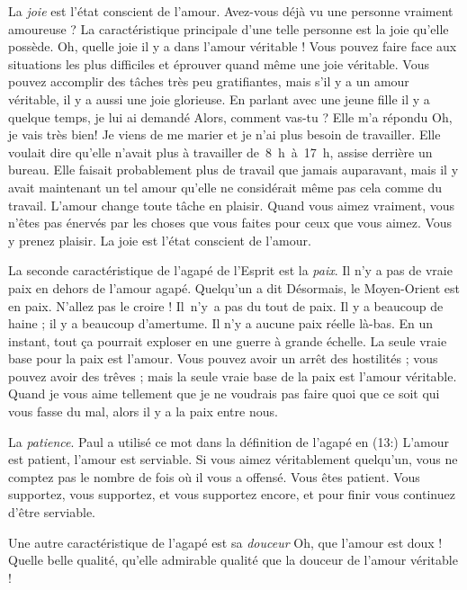 La \emph{joie} est l'état conscient de l'amour.
 Avez-vous déjà vu une
 personne vraiment amoureuse ?
 La caractéristique principale d'une telle personne est la joie
 qu'elle possède. Oh, quelle joie il y a dans l'amour véritable !
 Vous pouvez faire face aux situations les plus difficiles
 et éprouver quand même une joie véritable. Vous pouvez accomplir
 des tâches très peu gratifiantes, mais s'il y a un amour véritable,
 il y a aussi une joie glorieuse. En parlant avec une jeune fille
 il y a quelque temps, je lui ai demandé\frcolon{}
 \Og Alors, comment vas-tu ? \Fg{} Elle m'a répondu\frcolon{}
 \Og Oh, je vais très bien! Je viens de me marier et je n'ai plus besoin
 de travailler. \Fg{}
 Elle voulait dire qu'elle n'avait plus à travailler de~8~h~à~17~h,
 assise derrière un bureau. Elle faisait probablement plus de travail
 que jamais auparavant, mais il y avait maintenant un tel amour
 qu'elle ne considérait même pas cela comme du travail.
 L'amour change toute tâche en plaisir. Quand vous aimez vraiment,
 vous n'êtes pas énervés par les choses que vous faites
 pour ceux que vous aimez. Vous y prenez plaisir.
 La joie est l'état conscient de l'amour.

La seconde caractéristique de l'agapé de l'Esprit est la \emph{paix}.
 Il n'y a pas de vraie paix en dehors de l'amour agapé.
 Quelqu'un a dit\frcolon{} \Og Désormais, le Moyen-Orient est en paix. \Fg{}
 N'allez pas le croire ! Il~n'y~a pas du tout de paix.
 Il y a beaucoup de haine ; il y a beaucoup d'amertume.
 Il n'y a aucune paix réelle là-bas. En un instant, tout ça pourrait
 exploser en une guerre à grande échelle.
 La seule vraie base pour la paix est l'amour.
 Vous pouvez avoir un arrêt des hostilités ; vous pouvez avoir des trêves ;
 mais la seule vraie base de la paix est l'amour véritable.
 Quand je vous aime tellement que je ne voudrais pas faire
 quoi que ce soit qui vous fasse du mal, alors il y a la paix entre nous.

La \emph{patience}. Paul a utilisé ce mot dans la définition de l'agapé
 en (13:)\frcolon{}
 \Og L'amour est patient, l'amour est serviable. \Fg{}
 Si vous aimez véritablement quelqu'un, vous ne comptez pas
 le nombre de fois où il vous a offensé. Vous êtes patient.
 Vous supportez, vous supportez, et vous supportez encore,
 et pour finir vous continuez d'être serviable.

Une autre caractéristique de l'agapé est sa \emph{douceur}\frcolon{}
 Oh, que l'amour est doux ! Quelle belle qualité,
 qu'elle admirable qualité que la douceur de l'amour véritable !

